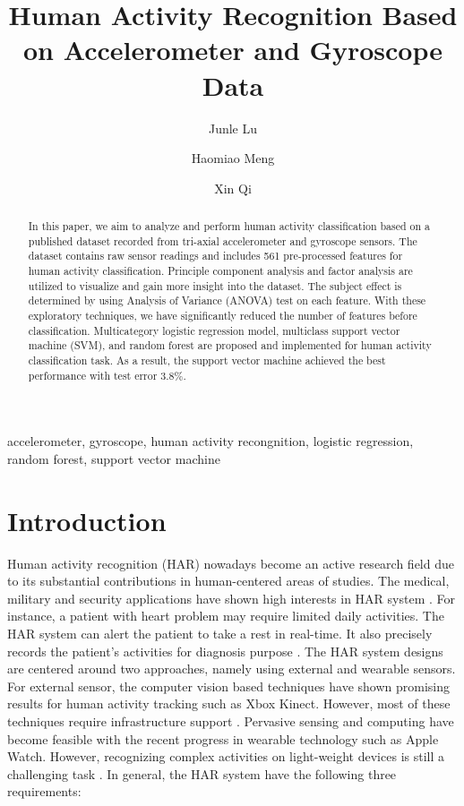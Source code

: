 \documentclass[conference]{IEEEtran}
\title{Human Activity Recognition Based on Accelerometer and Gyroscope Data}
\author[1]{Junle Lu}
\author[2]{Haomiao Meng}
\author[2]{Xin Qi}
\affil[1]{Department of Electrical and Computer Engineering}
\affil[2]{Department of Mathematical Sciences \protect\\
          State University of New York at Binghamton\\ NY 13905 \protect\\}
\begin{document}
\maketitle

\begin{abstract}
In this paper, we aim to analyze and perform human activity classification based on a published dataset recorded from tri-axial accelerometer and gyroscope sensors. The dataset contains raw sensor readings and includes 561 pre-processed features for human activity classification. Principle component analysis and factor analysis are utilized to visualize and gain more insight into the dataset. The subject effect is determined by using Analysis of Variance (ANOVA) test on each feature. With these exploratory techniques, we have significantly reduced the number of features before classification. Multicategory logistic regression model, multiclass support vector machine (SVM), and random forest are proposed and implemented for human activity classification task. As a result, the support vector machine achieved the best performance with test error 3.8$\%$.\\                                                                                                                
\end{abstract}
\renewcommand\IEEEkeywordsname{Keywords}

\begin{IEEEkeywords}
accelerometer,
gyroscope,
human activity recongnition,
logistic regression,
random forest,
support vector machine
\end{IEEEkeywords}

\section{Introduction}
Human activity recognition (HAR) nowadays become an active research field due to its substantial contributions in human-centered areas of studies. The medical, military and security applications have shown high interests in HAR system \cite{bayat2014study,hamalainen2011jerk}. For instance, a patient with heart problem may require limited daily activities. The HAR system can alert the patient to take a rest in real-time. It also precisely records the patient's activities for diagnosis purpose \cite{kwapisz2011activity}. The HAR system designs are centered around two approaches, namely using external and wearable sensors. For external sensor, the computer vision based techniques have shown promising results for human activity tracking such as Xbox Kinect. However, most of these techniques require infrastructure support \cite{lara2013survey, wuhuman}. Pervasive sensing and computing have become feasible with the recent progress in wearable technology such as Apple Watch. However, recognizing complex activities on light-weight devices is still a challenging task \cite{lara2013survey}. In general, the HAR system have the following three requirements:
\end{document}

